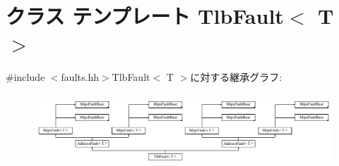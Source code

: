 \hypertarget{classMipsISA_1_1TlbFault}{
\section{クラス テンプレート TlbFault$<$ T $>$}
\label{classMipsISA_1_1TlbFault}
}


{\ttfamily \#include $<$faults.hh$>$}TlbFault$<$ T $>$に対する継承グラフ:\begin{figure}[H]
\begin{center}
\leavevmode
\includegraphics[height=2.77778cm]{classMipsISA_1_1TlbFault}
\end{center}
\end{figure}
